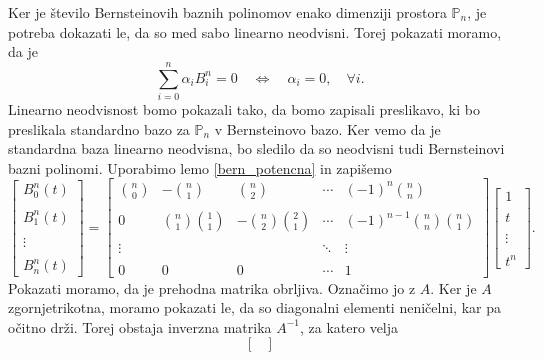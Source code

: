 \documentclass[mat1]{fmfdelo}
\newcommand{\B}{\mathcal B}
\begin{document}
\begin{dokaz}
	Ker je število Bernsteinovih baznih polinomov enako dimenziji prostora $\mathbb{P}_n$, je potreba dokazati le, da so med sabo linearno neodvisni. Torej pokazati moramo, da je
	\begin{equation*}
		\sum_{i=0}^n \alpha_i B_i^n = 0 \quad \Longleftrightarrow \quad \alpha_i = 0, \quad \forall i.
	\end{equation*}
	Linearno neodvisnost bomo pokazali tako, da bomo zapisali preslikavo, ki bo preslikala standardno bazo za $\mathbb{P}_n$ v Bernsteinovo bazo. Ker vemo da je standardna baza linearno neodvisna, bo sledilo da so neodvisni tudi Bernsteinovi bazni polinomi. Uporabimo lemo \ref{bern_potencna} in zapišemo
	\begin{equation*}
		\begin{bmatrix}
		B_0^n(t) \\ \\B_1^n(t) \\ \\ \vdots \\ \\ B_n^n(t)
		\end{bmatrix}
		= 
		\begin{bmatrix}
		\binom{n}{0} & -\binom{n}{1} & \binom{n}{2} &\cdots &(-1)^n \binom{n}{n} \\ \\
		0 & \binom{n}{1} \binom{1}{1} &-\binom{n}{2} \binom{2}{1} &\cdots & (-1)^{n-1} \binom{n}{n} \binom{n}{1} \\ \\
		\vdots &&&\ddots& \vdots \\ \\
		0 &0& 0 & \cdots & 1
		\end{bmatrix}
		\begin{bmatrix}
		1 \\ \\ t  \\ \\ \vdots \\ \\ t^n
		\end{bmatrix}.
	\end{equation*}
	Pokazati moramo, da je prehodna matrika obrljiva. Označimo jo z $A$. Ker je $A$ zgornjetrikotna, moramo pokazati le, da so diagonalni elementi neničelni, kar pa očitno drži. Torej obstaja inverzna matrika $A^{-1}$, za katero velja
	\begin{equation*}
		\begin{bmatrix}

\end{bmatrix}
\end{equation*}
\end{dokaz}
\end{document}
